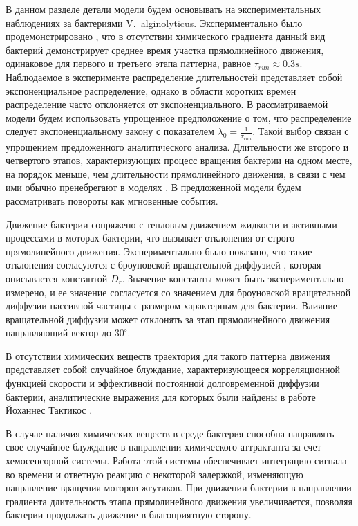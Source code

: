 В данном разделе детали модели будем основывать на экспериментальных наблюдениях за бактериями V.~alginolyticus. Экспериментально было продемонстрировано \cite{altindal_implications_2011}, что в отсутствии химического градиента данный вид бактерий демонстрирует среднее время участка прямолинейного движения, одинаковое для первого и третьего этапа паттерна, равное $\tau_{run} \approx 0.3s$. Наблюдаемое в эксперименте распределение длительностей представляет собой экспоненциальное распределение, однако в области коротких времен распределение часто отклоняется от экспоненциального. В рассматриваемой модели будем использовать упрощенное предположение о том, что распределение следует экспоненциальному закону с показателем $\lambda_0=\frac{1}{\tau_{run}}$. Такой выбор связан с упрощением предложенного аналитического анализа. Длительности же второго и четвертого этапов, характеризующих процесс вращения бактерии на одном месте, на порядок меньше, чем длительности прямолинейного движения, в связи с чем ими обычно пренебрегают в моделях \cite{block_adaptation_1983}. В предложенной модели будем рассматривать повороты как мгновенные события.

Движение бактерии сопряжено с тепловым движением жидкости и активными процессами в моторах бактерии, что вызывает отклонения от строго прямолинейного движения. Экспериментально было показано, что такие отклонения согласуются с броуновской вращательной диффузией \cite{berg_chemotaxis_1972}, которая описывается константой $D_r$. Значение константы может быть экспериментально измерено, и ее значение согласуется со значением для броуновской вращательной диффузии пассивной частицы с размером характерным для бактерии. Влияние вращательной диффузии может отклонять за этап прямолинейного движения направляющий вектор до $30^\circ$. 

В отсутствии химических веществ траектория для такого паттерна движения представляет собой случайное блуждание, характеризующееся корреляционной функцией скорости и эффективной постоянной долговременной диффузии бактерии, аналитические выражения для которых были найдены в работе Йоханнес Тактикос \cite{taktikos_how_2013}. 

В случае наличия химических веществ в среде бактерия способна направлять свое случайное блуждание в направлении химического аттрактанта за счет хемосенсорной системы. Работа этой системы обеспечивает интеграцию сигнала во времени и ответную реакцию с некоторой задержкой, изменяющую направление вращения моторов жгутиков. При движении бактерии в направлении градиента длительность этапа прямолинейного движения увеличивается, позволяя бактерии продолжать движение в благоприятную сторону. 

